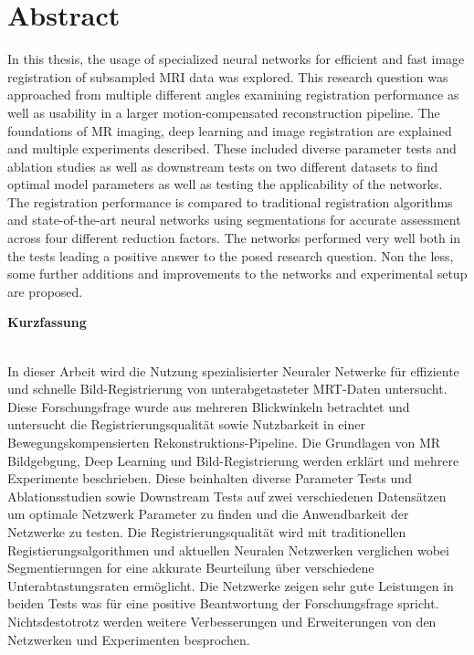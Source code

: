 \chapter*{Abstract}
In this thesis, the usage of specialized neural networks for efficient and fast image registration of subsampled MRI data was explored. This research question was approached from multiple different angles examining registration performance as well as usability in a larger motion-compensated reconstruction pipeline. The foundations of MR imaging, deep learning and image registration are explained and multiple experiments described. These included diverse parameter tests and ablation studies as well as downstream tests on two different datasets to find optimal model parameters as well as testing the applicability of the networks. The registration performance is compared to traditional registration algorithms and state-of-the-art neural networks using segmentations for accurate assessment across four different reduction factors. The networks performed very well both in the tests leading a positive answer to the posed research question. Non the less, some further additions and improvements to the networks and experimental setup are proposed.

\vspace*{1.5cm}
\begin{Huge}
\noindent \textbf{Kurzfassung}
\end{Huge}
\chapterheadstartvskip \\
In dieser Arbeit wird die Nutzung spezialisierter Neuraler Netwerke für effiziente und schnelle Bild-Registrierung von unterabgetasteter MRT-Daten untersucht. Diese Forschungsfrage wurde aus mehreren Blickwinkeln betrachtet und untersucht die Registrierungsqualität sowie Nutzbarkeit in einer Bewegungskompensierten Rekonstruktions-Pipeline. Die Grundlagen von MR Bildgebgung, Deep Learning und Bild-Registrierung werden erklärt und mehrere Experimente beschrieben. Diese beinhalten diverse Parameter Tests und Ablationsstudien sowie Downstream Tests auf zwei verschiedenen Datensätzen um optimale Netzwerk Parameter zu finden und die Anwendbarkeit der Netzwerke zu testen. Die Registrierungsqualität wird mit traditionellen Registierungsalgorithmen und aktuellen Neuralen Netzwerken verglichen  wobei Segmentierungen for eine akkurate Beurteilung über verschiedene Unterabtastungsraten ermöglicht. Die Netzwerke zeigen sehr gute Leistungen in beiden Tests was für eine positive Beantwortung der Forschungsfrage spricht. Nichtsdestotrotz werden weitere Verbesserungen und Erweiterungen von den Netzwerken und Experimenten besprochen.
